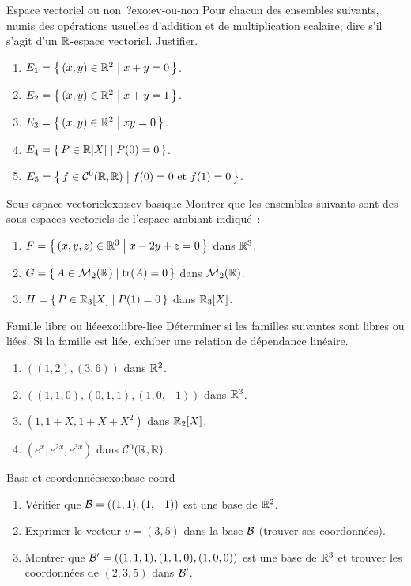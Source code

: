 \begin{exercise}{\basic{} Espace vectoriel ou non~?}{exo:ev-ou-non}
  Pour chacun des ensembles suivants, munis des opérations usuelles
  d'addition et de multiplication scalaire, dire s'il s'agit d'un
  ${\mathbb{R}}$-espace vectoriel. Justifier.
  \begin{enumerate}[label=(\alph*)]
    \item $E_1=\left\{\,(x,y)\in{\mathbb{R}}^2\;\middle|\;x+y=0\,\right\}$.
    \item $E_2=\left\{\,(x,y)\in{\mathbb{R}}^2\;\middle|\;x+y=1\,\right\}$.
    \item $E_3=\left\{\,(x,y)\in{\mathbb{R}}^2\;\middle|\;xy=0\,\right\}$.
    \item $E_4=\left\{\,P\in{\mathbb{R}}[X]\;\middle|\;P(0)=0\,\right\}$.
    \item $E_5=\left\{\,f\in{\mathcal{C}}^0({\mathbb{R}},{\mathbb{R}})\;\middle|\;f(0)=0\text{ et }f(1)=0\,\right\}$.
  \end{enumerate}
\end{exercise}

\begin{exercise}{\basic{} Sous-espace vectoriel}{exo:sev-basique}
  Montrer que les ensembles suivants sont des sous-espaces vectoriels
  de l'espace ambiant indiqué~:
  \begin{enumerate}[label=(\alph*)]
    \item $F=\left\{\,(x,y,z)\in{\mathbb{R}}^3\;\middle|\;x-2y+z=0\,\right\}$ dans ${\mathbb{R}}^3$.
    \item $G=\left\{\,A\in\mathcal{M}_2({\mathbb{R}})\;\middle|\;\operatorname{tr}(A)=0\,\right\}$ dans $\mathcal{M}_2({\mathbb{R}})$.
    \item $H=\left\{\,P\in{\mathbb{R}}_3[X]\;\middle|\;P(1)=0\,\right\}$ dans ${\mathbb{R}}_3[X]$.
  \end{enumerate}
\end{exercise}

\begin{exercise}{\basic{} Famille libre ou liée}{exo:libre-liee}
  Déterminer si les familles suivantes sont libres ou liées. Si la
  famille est liée, exhiber une relation de dépendance linéaire.
  \begin{enumerate}[label=(\alph*)]
    \item $((1,2),(3,6))$ dans ${\mathbb{R}}^2$.
    \item $((1,1,0),(0,1,1),(1,0,-1))$ dans ${\mathbb{R}}^3$.
    \item $(1,1+X,1+X+X^2)$ dans ${\mathbb{R}}_2[X]$.
    \item $(e^x,e^{2x},e^{3x})$ dans ${\mathcal{C}}^0({\mathbb{R}},{\mathbb{R}})$.
  \end{enumerate}
\end{exercise}

\begin{exercise}{\basic{} Base et coordonnées}{exo:base-coord}
  \begin{enumerate}[label=(\alph*)]
    \item Vérifier que ${\mathcal{B}}=((1,1),(1,-1))$ est une base de ${\mathbb{R}}^2$.
    \item Exprimer le vecteur $v=(3,5)$ dans la base ${\mathcal{B}}$ (trouver ses
      coordonnées).
    \item Montrer que ${\mathcal{B}}'=((1,1,1),(1,1,0),(1,0,0))$ est une base de
      ${\mathbb{R}}^3$ et trouver les coordonnées de $(2,3,5)$ dans ${\mathcal{B}}'$.
  \end{enumerate}
\end{exercise}

